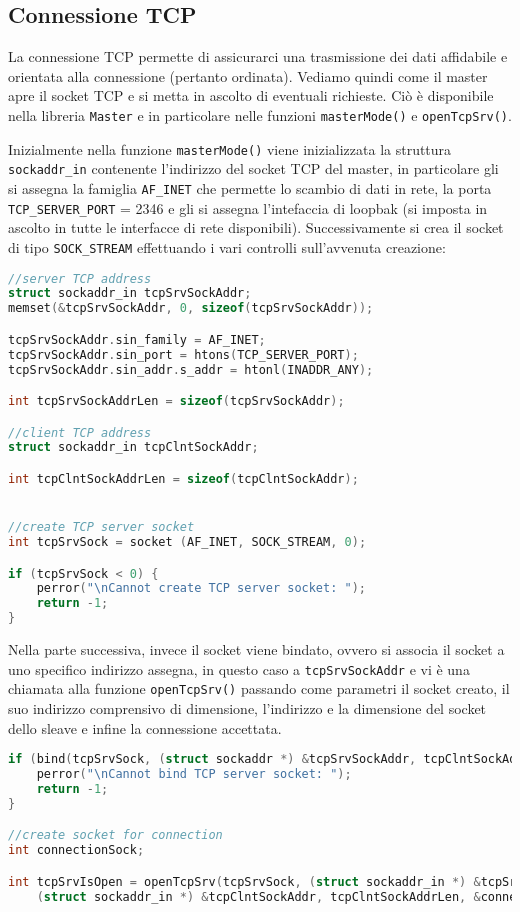 \documentclass[11pt,fleqn]{book} %
\begin{document}
\subsection{Connessione TCP}
La connessione TCP permette di assicurarci una trasmissione dei dati affidabile e orientata alla connessione (pertanto ordinata). Vediamo quindi come il master apre il socket TCP e si metta in ascolto di eventuali richieste.
Ciò è disponibile nella libreria \texttt{Master} e in particolare nelle funzioni \texttt{masterMode()} e \texttt{openTcpSrv()}.

Inizialmente nella funzione \texttt{masterMode()} viene inizializzata la struttura \texttt{sockaddr\_in} contenente l'indirizzo del socket TCP del master, in particolare gli si assegna la famiglia \texttt{AF\_INET} che permette lo scambio di dati in rete, la porta \texttt{TCP\_SERVER\_PORT} = 2346 e gli si assegna l'intefaccia di loopbak (si imposta in ascolto in tutte le interfacce di rete disponibili).
Successivamente si crea il socket di tipo \texttt{SOCK\_STREAM} effettuando i vari controlli sull'avvenuta creazione:
\begin{lstlisting}[language=C]
//server TCP address
struct sockaddr_in tcpSrvSockAddr;
memset(&tcpSrvSockAddr, 0, sizeof(tcpSrvSockAddr));

tcpSrvSockAddr.sin_family = AF_INET;
tcpSrvSockAddr.sin_port = htons(TCP_SERVER_PORT);
tcpSrvSockAddr.sin_addr.s_addr = htonl(INADDR_ANY);

int tcpSrvSockAddrLen = sizeof(tcpSrvSockAddr);

//client TCP address
struct sockaddr_in tcpClntSockAddr;

int tcpClntSockAddrLen = sizeof(tcpClntSockAddr);


//create TCP server socket
int tcpSrvSock = socket (AF_INET, SOCK_STREAM, 0);

if (tcpSrvSock < 0) {
	perror("\nCannot create TCP server socket: ");
	return -1;
}
\end{lstlisting}

Nella parte successiva, invece il socket viene bindato, ovvero si associa il socket a uno specifico indirizzo assegna, in questo caso a \texttt{tcpSrvSockAddr} e vi è una chiamata alla funzione \texttt{openTcpSrv()} passando come parametri il socket creato, il suo indirizzo comprensivo di dimensione, l'indirizzo e la dimensione del socket dello sleave e infine la connessione accettata.

\begin{lstlisting}[language=C]
if (bind(tcpSrvSock, (struct sockaddr *) &tcpSrvSockAddr, tcpClntSockAddrLen) < 0) {
	perror("\nCannot bind TCP server socket: ");
	return -1;
}

//create socket for connection 
int connectionSock;

int tcpSrvIsOpen = openTcpSrv(tcpSrvSock, (struct sockaddr_in *) &tcpSrvSockAddr, tcpSrvSockAddrLen, 
	(struct sockaddr_in *) &tcpClntSockAddr, tcpClntSockAddrLen, &connectionSock);

\end{lstlisting}
\end{document}
